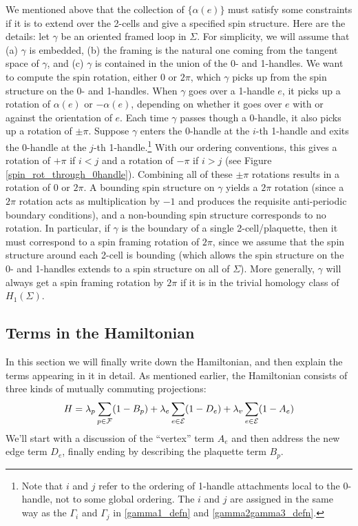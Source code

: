 We mentioned above that the collection of $\{\alpha(e)\}$ must satisfy some constraints if it is 
to extend over the 2-cells and give a specified spin structure.
Here are the details:
let $\gamma$ be an oriented framed loop in $\Sigma$.
For simplicity, we will assume that (a) $\gamma$ is embedded, (b) the framing is the natural one coming from the tangent 
space of $\gamma$, and (c) $\gamma$ is contained in the union of the 0- and 1-handles.
We want to compute the spin rotation, either 0 or $2\pi$, which $\gamma$ picks up from the spin structure on the 0- and 1-handles.
When $\gamma$ goes over a 1-handle $e$, it picks up a rotation of $\alpha(e)$ or $-\alpha(e)$, depending on whether it goes over $e$
with or against the orientation of $e$.
Each time $\gamma$ passes though a 0-handle, it also picks up a rotation of $\pm\pi$.
Suppose $\gamma$ enters the 0-handle at the $i$-th 1-handle and exits the 0-handle at the $j$-th 1-handle.\footnote{
Note that $i$ and $j$ refer to the ordering of 1-handle attachments local to the 0-handle, not to some global ordering. The $i$ and $j$ are assigned in the same way as the $\Gamma_i$ and $\Gamma_j$ in \eqref{gamma1_defn} and \eqref{gamma2gamma3_defn}.}
With our ordering conventions, this gives a rotation of $+\pi$ if $i<j$ and a rotation of $-\pi$ if $i > j$ (see Figure \ref{spin_rot_through_0handle}).
Combining all of these $\pm\pi$ rotations results in a rotation of 0 or $2\pi$.
A bounding spin structure on $\gamma$ yields a $2\pi$ rotation (since a $2\pi$ rotation acts as 
multiplication by $-1$ and produces the requisite anti-periodic boundary conditions), and a non-bounding 
spin structure corresponds to no rotation.
In particular, if $\gamma$ is the boundary of a single 2-cell/plaquette, then it must correspond to a spin 
framing rotation of $2\pi$, since we assume that the spin structure around each 2-cell is bounding (which 
allows the spin structure on the 0- and 1-handles extends to a spin structure on all of $\Sigma$). 
More generally, $\gamma$ will always get a spin framing rotation by $2\pi$ if it is in the trivial homology 
class of $H_1(\Sigma)$.



\subsection{Terms in the Hamiltonian} \label{terms_in_Hamiltonian}

In this section we will finally write down the Hamiltonian, and then explain the terms appearing in it in detail. 
As mentioned earlier, the Hamiltonian consists of three kinds of mutually commuting projections:
\begin{align} \label{terms_in_ham}
H = \lambda_p \sum_{p \in \mathcal{F}} (1-B_p)  + \lambda_e \sum_{e \in \mathcal{E}} (1-D_e) + \lambda_v \sum_{e\in \mathcal{E}} (1-A_e)
\end{align}
We'll start with a discussion of the ``vertex'' term $A_e$ and then address the new edge term $D_e$, 
finally ending by describing the plaquette term $B_p$.




